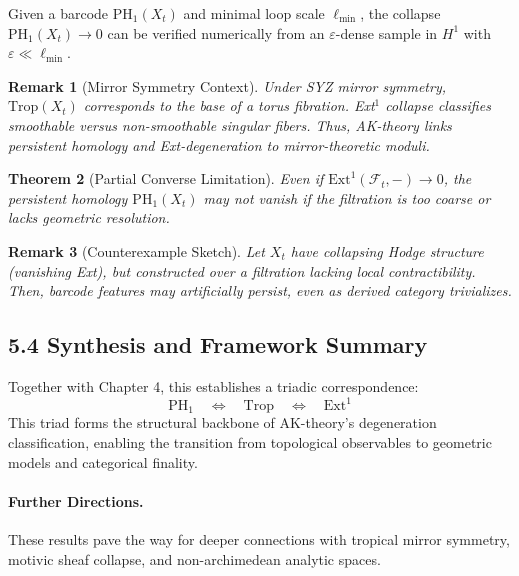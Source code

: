 \documentclass[11pt]{article}
\newtheorem{theorem}{Theorem}[section]
\newtheorem{remark}[theorem]{Remark}
\begin{document}
\begin{proposition}
Given a barcode $\mathrm{PH}_1(X_t)$ and minimal loop scale $\ell_{\min}$, the collapse $\mathrm{PH}_1(X_t) \to 0$ can be verified numerically from an $\varepsilon$-dense sample in $H^1$ with $\varepsilon \ll \ell_{\min}$.
\end{proposition}

\begin{remark}[Mirror Symmetry Context]
Under SYZ mirror symmetry, $\mathrm{Trop}(X_t)$ corresponds to the base of a torus fibration. Ext$^1$ collapse classifies smoothable versus non-smoothable singular fibers. Thus, AK-theory links persistent homology and Ext-degeneration to mirror-theoretic moduli.
\end{remark}

\begin{theorem}[Partial Converse Limitation]
Even if $\mathrm{Ext}^1(\mathcal{F}_t, -) \to 0$, the persistent homology $\mathrm{PH}_1(X_t)$ may not vanish if the filtration is too coarse or lacks geometric resolution.
\end{theorem}

\begin{remark}[Counterexample Sketch]
Let $X_t$ have collapsing Hodge structure (vanishing Ext), but constructed over a filtration lacking local contractibility. Then, barcode features may artificially persist, even as derived category trivializes.
\end{remark}

\subsection{5.4 Synthesis and Framework Summary}

Together with Chapter 4, this establishes a triadic correspondence:
\[
\mathrm{PH}_1 \quad \Longleftrightarrow \quad \mathrm{Trop} \quad \Longleftrightarrow \quad \mathrm{Ext}^1
\]
This triad forms the structural backbone of AK-theory’s degeneration classification, enabling the transition from topological observables to geometric models and categorical finality.

\paragraph{Further Directions.}
These results pave the way for deeper connections with tropical mirror symmetry, motivic sheaf collapse, and non-archimedean analytic spaces.
\end{document}

